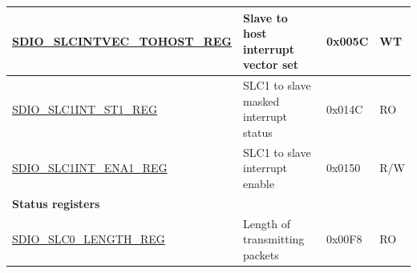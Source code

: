 \begin{longtable}{ | p{7.1cm} | p{6.1cm} | p{1.2cm} | p{1cm} | }
\hyperref[regdesc:SDIOSLCINTVECTOHOSTREG]{SDIO\_SLCINTVEC\_TOHOST\_REG} & Slave to host interrupt vector set & 0x005C & WT \\ \hline
\hyperref[regdesc:SDIOSLC1INTST1REG]{SDIO\_SLC1INT\_ST1\_REG} & SLC1 to slave masked interrupt status & 0x014C & RO \\ \hline
\hyperref[regdesc:SDIOSLC1INTENA1REG]{SDIO\_SLC1INT\_ENA1\_REG} & SLC1 to slave interrupt enable & 0x0150 & R/W \\ \hline
\multicolumn{4}{|l|}{\textbf{Status registers}} \\ \hline
\hyperref[regdesc:SDIOSLC0LENGTHREG]{SDIO\_SLC0\_LENGTH\_REG} & Length of transmitting packets & 0x00F8 & RO \\ \hline
\end{longtable}

